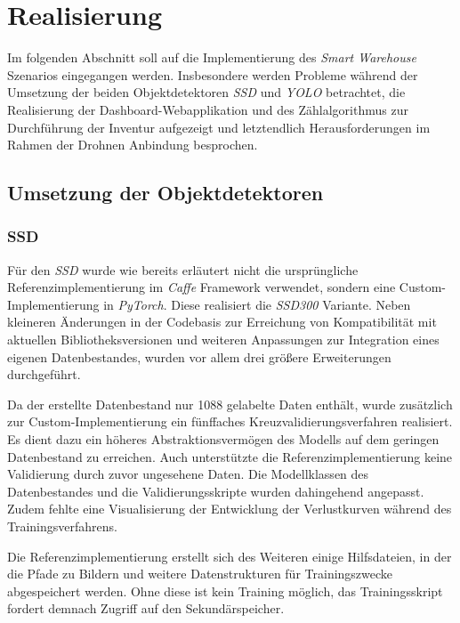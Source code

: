 \chapter{Realisierung}

Im folgenden Abschnitt soll auf die Implementierung des \textit{Smart Warehouse} Szenarios eingegangen werden. Insbesondere werden Probleme während der Umsetzung der beiden Objektdetektoren \textit{SSD} und \textit{YOLO} betrachtet, die Realisierung der Dashboard-Webapplikation und des Zählalgorithmus zur Durchführung der Inventur aufgezeigt und letztendlich Herausforderungen im Rahmen der Drohnen Anbindung besprochen.

\section{Umsetzung der Objektdetektoren}

\subsection*{SSD}

Für den \textit{SSD} wurde wie bereits erläutert nicht die ursprüngliche Referenzimplementierung im \textit{Caffe} Framework verwendet, sondern eine Custom-Implementierung in \textit{PyTorch}. Diese realisiert die \textit{SSD300} Variante. Neben kleineren Änderungen in der Codebasis zur Erreichung von Kompatibilität mit aktuellen Bibliotheksversionen und weiteren Anpassungen zur Integration eines eigenen Datenbestandes, wurden vor allem drei größere Erweiterungen durchgeführt. 

Da der erstellte Datenbestand nur 1088 gelabelte Daten enthält, wurde zusätzlich zur Custom-Implementierung ein fünffaches Kreuzvalidierungsverfahren realisiert. Es dient dazu ein höheres Abstraktionsvermögen des Modells auf dem geringen Datenbestand zu erreichen. Auch unterstützte die Referenzimplementierung keine Validierung durch zuvor ungesehene Daten. Die Modellklassen des Datenbestandes und die Validierungsskripte wurden dahingehend angepasst. Zudem fehlte eine Visualisierung der Entwicklung der Verlustkurven während des Trainingsverfahrens.

Die Referenzimplementierung erstellt sich des Weiteren einige Hilfsdateien, in der die Pfade zu Bildern und weitere Datenstrukturen für Trainingszwecke abgespeichert werden. Ohne diese ist kein Training möglich, das Trainingsskript fordert demnach Zugriff auf den Sekundärspeicher. 

